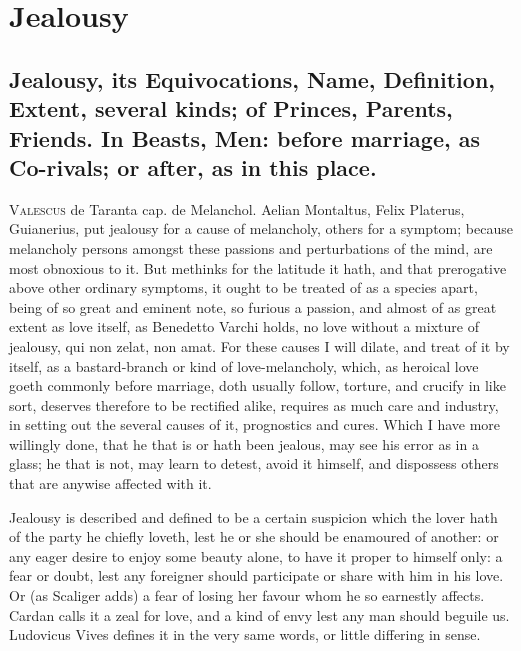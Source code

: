 \chapter{Jealousy}
{

\section[Jealousy, its Equivocations, Name, Definition\ldots{}]{Jealousy, its Equivocations, Name, Definition, Extent, several kinds; of Princes, Parents, Friends. In Beasts, Men: before marriage, as Co-rivals; or after, as in this place.}

\lettrine{V}{alescus} de Taranta cap. de Melanchol. Aelian Montaltus, Felix
Platerus, Guianerius, put jealousy for a cause of melancholy, others
for a symptom; because melancholy persons amongst these passions and
perturbations of the mind, are most obnoxious to it. But methinks for
the latitude it hath, and that prerogative above other ordinary
symptoms, it ought to be treated of as a species apart, being of so
great and eminent note, so furious a passion, and almost of as great
extent as love itself, as Benedetto Varchi holds, no love without
a mixture of jealousy, qui non zelat, non amat. For these causes I will
dilate, and treat of it by itself, as a bastard-branch or kind of
love-melancholy, which, as heroical love goeth commonly before
marriage, doth usually follow, torture, and crucify in like sort,
deserves therefore to be rectified alike, requires as much care and
industry, in setting out the several causes of it, prognostics and
cures. Which I have more willingly done, that he that is or hath been
jealous, may see his error as in a glass; he that is not, may learn to
detest, avoid it himself, and dispossess others that are anywise
affected with it.

Jealousy is described and defined to be a certain suspicion which
the lover hath of the party he chiefly loveth, lest he or she should be
enamoured of another: or any eager desire to enjoy some beauty alone,
to have it proper to himself only: a fear or doubt, lest any foreigner
should participate or share with him in his love. Or (as Scaliger
adds) a fear of losing her favour whom he so earnestly affects. Cardan
calls it a zeal for love, and a kind of envy lest any man should
beguile us. Ludovicus Vives defines it in the very same words, or
little differing in sense.

}

